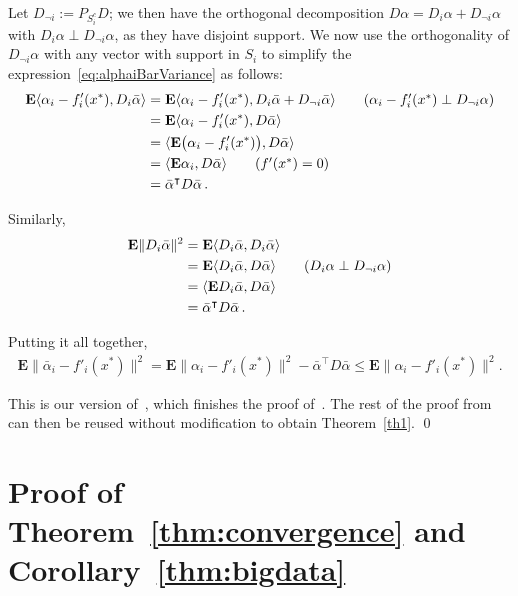 \documentclass[twoside]{article}
\newcommand{\Econd}{\mathbf{E}}
\begin{document}
Let $D_{\neg i} := P_{S_i^c} D$; we then have the orthogonal decomposition $D \alpha = D_i \alpha + D_{\neg i} \alpha$ with $D_i \alpha \perp D_{\neg i} \alpha$, as they have disjoint support. We now use the orthogonality of $D_{\neg i} \alpha$ with any vector with support in $S_i$ to simplify the expression~\eqref{eq:alphaiBarVariance} as follows:
\begin{align}
\Econd \langle \alpha_i - f'_i(x^*), D_i\bar \alpha \rangle
&= \Econd \langle \alpha_i - f'_i(x^*), D_i \bar \alpha + D_{\neg i} \bar \alpha \rangle 
	\tag*{$(\alpha_i - f'_i(x^*) \perp D_{\neg i} \alpha)$}
\nonumber \\
&= \Econd \langle \alpha_i - f'_i(x^*), D \bar \alpha \rangle
\nonumber \\
&= \langle \Econd \big(\alpha_i - f'_i(x^*)\big), D \bar \alpha \rangle
\nonumber \\
&= \langle \Econd \alpha_i, D \bar \alpha \rangle
	\tag*{($f'(x^*) = 0$)}
\nonumber \\
&=\bar \alpha^\intercal D \bar \alpha \,  .
\end{align}

Similarly, 
\begin{align}
\Econd \|D_i\bar \alpha\|^2 
&= \Econd\langle D_i\bar \alpha, D_i\bar \alpha \rangle
\nonumber \\
&= \Econd\langle D_i\bar \alpha, D \bar \alpha \rangle
	\tag*{($D_i \alpha \perp D_{\neg i} \alpha$)}
\nonumber \\
&= \langle \Econd D_i\bar \alpha, D \bar \alpha \rangle
\nonumber \\
&= \bar \alpha^\intercal D \bar \alpha  \, .
\end{align}

Putting it all together,
\begin{align}
\Econd \|\bar \alpha_i -f'_i(x^*)\|^2 
= \Econd \|\alpha_i -f'_i(x^*)\|^2 - \bar \alpha^\intercal D \bar \alpha
\leq \Econd \|\alpha_i -f'_i(x^*)\|^2 .
\end{align}

This is our version of~\citet[Equation (9)]{qsaga}, which finishes the proof of~\citet[Lemma~1]{qsaga}. 
The rest of the proof from~\citet{qsaga} can then be reused without modification to obtain Theorem~\ref{th1}.
\qed

\section{Proof of Theorem~\ref{thm:convergence} and Corollary~\ref{thm:bigdata}}\label{apxB}
\end{document}
